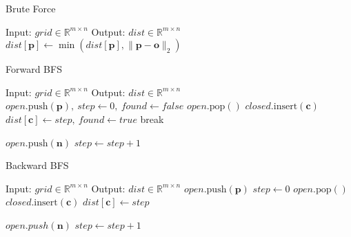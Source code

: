 \documentclass{article}
\begin{document}
\begin{algorithm}
    \caption{Brute Force}
    \begin{algorithmic}[1]
        \STATE Input: $grid \in \mathbb{R}^{m \times n}$
        \STATE Output: $dist \in \mathbb{R}^{m \times n}$
                \STATE $dist[\bm{p}]\gets \min(dist[\bm{p}], \| \bm{p} - \bm{o} \|_2)$
            \ENDFOR
        \ENDFOR
    \end{algorithmic}
\end{algorithm}

\begin{algorithm}
    \caption{Forward BFS}
    \begin{algorithmic}[1]
        \STATE Input: $grid \in \mathbb{R}^{m \times n}$
        \STATE Output: $dist \in \mathbb{R}^{m \times n}$
            \STATE $open.\mathrm{push}(\bm{p}),\ step \gets 0,\ found \gets false$
                    \STATE $open.\mathrm{pop}()$
                    \STATE $closed.\mathrm{insert}(\bm{c})$
                        \STATE $dist[\bm{c}] \gets step,\ found \gets true$
                        \STATE break
                    \ENDIF

                        \STATE $open.\mathrm{push}(\bm{n})$
                    \ENDFOR
                \ENDFOR
                \STATE $step \gets step + 1$
            \ENDWHILE
        \ENDFOR
    \end{algorithmic}
\end{algorithm}

\begin{algorithm}
    \caption{Backward BFS}
    \begin{algorithmic}[1]
        \STATE Input: $grid \in \mathbb{R}^{m \times n}$
        \STATE Output: $dist \in \mathbb{R}^{m \times n}$
                \STATE $open.\mathrm{push}(\bm{p})$
            \ENDIF
        \ENDFOR
        \STATE $step \gets 0$
                \STATE $open.\mathrm{pop}()$
                \STATE $closed.\mathrm{insert}(\bm{c})$
                \STATE $dist[\bm{c}] \gets step$

                    \STATE $open.push(\bm{n})$
                \ENDFOR
            \ENDFOR
            \STATE $step \gets step + 1$
        \ENDWHILE
    \end{algorithmic}
\end{algorithm}
\end{document}
